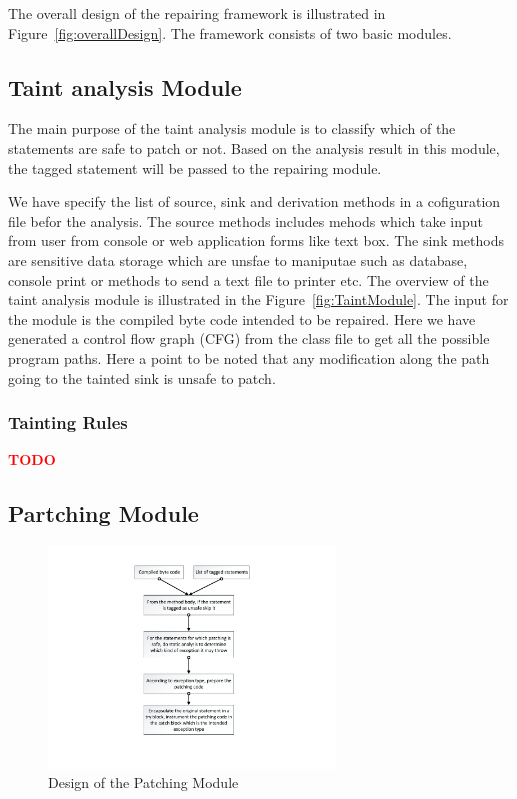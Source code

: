 \documentclass{sigplanconf}
\begin{document}
The overall design of the repairing framework is illustrated in
Figure~\ref{fig:overallDesign}. The framework consists of two basic modules.


\subsection{Taint analysis Module}
\label{subsec:TaintModule}

The main purpose of the taint analysis module is to classify which of the
statements are safe to patch or not. Based on the analysis result in this
module, the tagged statement will be passed to the repairing module.


We have specify the list of source, sink and derivation methods in a
cofiguration file befor the analysis. The source methods includes mehods which
take input from user from console or web application forms like text box. The
sink methods are sensitive data storage which are unsfae to maniputae such as
database, console print or methods to send a text file to printer etc. The
overview of the taint analysis module is illustrated in the
Figure~\ref{fig:TaintModule}.  The input for the module is the compiled byte
code intended to be repaired. Here we have generated a control flow graph (CFG)
from the class file to get all the possible program paths. Here a point to be
noted that any modification along the path going to the tainted sink is unsafe
to patch.

\subsubsection{Tainting Rules}
\textcolor{red}{\textbf{TODO}}\newline


\subsection{Partching Module}
\label{subsec:PatchModule}

\begin{figure}
\centering
  \includegraphics[width= 3.0in]{images/PatchModule.pdf}
  \caption{Design of the Patching Module}
  \label{fig:PatchModule}
\end{figure}
\end{document}
